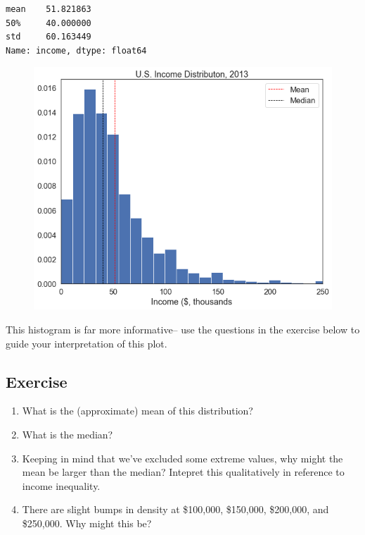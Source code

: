 \documentclass[
  letterpaper,
  DIV=11,
  numbers=noendperiod]{scrreprt}
\providecommand{\tightlist}{%
  \setlength{\itemsep}{0pt}\setlength{\parskip}{0pt}}\usepackage{longtable,booktabs,array}
\begin{document}
\begin{verbatim}
mean    51.821863
50%     40.000000
std     60.163449
Name: income, dtype: float64
\end{verbatim}

\begin{figure}[H]

{\centering \includegraphics{notebooks/W07. Distributions and Basic Statistics_files/figure-pdf/cell-13-output-2.png}

}

\end{figure}

This histogram is far more informative-- use the questions in the
exercise below to guide your interpretation of this plot.

\hypertarget{exercise-19}{%
\subsection{Exercise}\label{exercise-19}}

\begin{enumerate}
\def\labelenumi{\arabic{enumi}.}
\tightlist
\item
  What is the (approximate) mean of this distribution?
\item
  What is the median?
\item
  Keeping in mind that we've excluded some extreme values, why might the
  mean be larger than the median? Intepret this qualitatively in
  reference to income inequality.
\item
  There are slight bumps in density at \$100,000, \$150,000, \$200,000,
  and \$250,000. Why might this be?
\end{enumerate}
\end{document}

